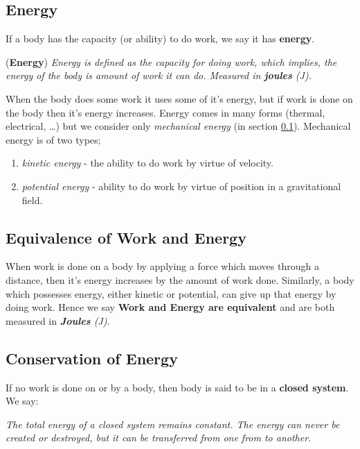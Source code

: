 \subsection{Energy}
\label{subsection:energy}
If a body has the capacity (or ability) to do work, we say it has \textbf{energy}.
\begin{definition}{(\textbf{Energy})}
\textit{Energy is defined as the capacity for doing work, which implies, the energy of the body is amount of work it can do. Measured in \textbf{joules} (J).}
\end{definition}

When the body does some work it uses some of it's energy, but if work is done on the body then it's energy increases. Energy comes in many forms (thermal, electrical, \ldots) but we consider only \textit{mechanical energy} (in section \ref{subsection:energy}). Mechanical energy is of two types;
\begin{enumerate}
    \item \textit{kinetic energy} - the ability to do work by virtue of velocity.
    \item \textit{potential energy} - ability to do work by virtue of position in a gravitational field.
\end{enumerate}

\subsection{Equivalence of Work and Energy}

When work is done on a body by applying a force which moves through a distance, then it's energy increases by the amount of work done.
Similarly, a body which possesses energy, either kinetic or potential, can give up that energy by doing work. Hence we say \textbf{Work and Energy are equivalent} and are both measured in \textit{\textbf{Joules} (J)}.

\subsection{Conservation of Energy}

If no work is done on or by a body, then body is said to be in a \textbf{closed system}. We say:

\begin{center}
    \textit{The total energy of a closed system remains constant. The energy can never be created or destroyed, but it can be transferred from one from to another.}
\end{center}

